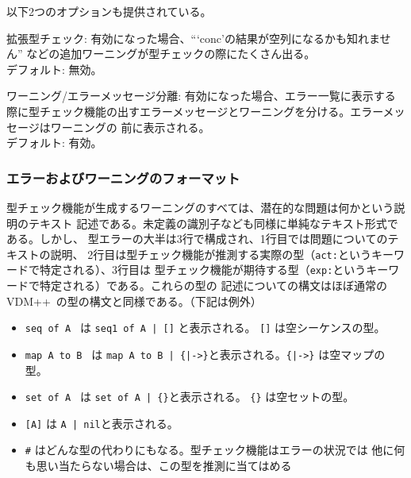 \documentclass[\pformat,12pt]{jarticle}
\newcommand{\vdmslpp}{VDM++}
\begin{document}
以下2つのオプションも提供されている。

\begin{list}{}{}

\item[{\sf 拡張型チェック}:]  有効になった場合、“‘conc’の結果が空列になるかも知れません”
などの追加ワーニングが型チェックの際にたくさん出る。\\
  デフォルト: 無効。

\item[\textsf{ワーニング/エラーメッセージ分離}:] 有効になった場合、エラー一覧に表示する
  際に型チェック機能の出すエラーメッセージとワーニングを分ける。エラーメッセージはワーニングの
  前に表示される。\\
  デフォルト: 有効。
\end{list}


\subsubsection{エラーおよびワーニングのフォーマット}\label{subsub:tcerr}


型チェック機能が生成するワーニングのすべては、潜在的な問題は何かという説明のテキスト
記述である。未定義の識別子なども同様に単純なテキスト形式である。しかし、
型エラーの大半は3行で構成され、1行目では問題についてのテキストの説明、
2行目は型チェック機能が推測する実際の型（\texttt{act:}というキーワードで特定される）、3行目は
型チェック機能が期待する型（\texttt{exp:}というキーワードで特定される）である。これらの型の
記述についての構文はほぼ通常の\vdmslpp\ の型の構文と同様である。（下記は例外）

\begin{itemize}

\item {\tt seq of A } は {\tt seq1 of A | []} と表示される。 {\tt []} は空シーケンスの型。
  
\item {\tt map A to B } は {\tt map A to B | \{|->\}}と表示される。{\tt \{|->\}} は空マップの型。 
  
\item {\tt set of A } は {\tt set of A | \{\}}と表示される。 {\tt \{\}} は空セットの型。
  
\item {\tt [A]} は {\tt A | nil}と表示される。
  
\item {\tt \#} はどんな型の代わりにもなる。型チェック機能はエラーの状況では
  他に何も思い当たらない場合は、この型を推測に当てはめる
\end{itemize}
\end{document}

